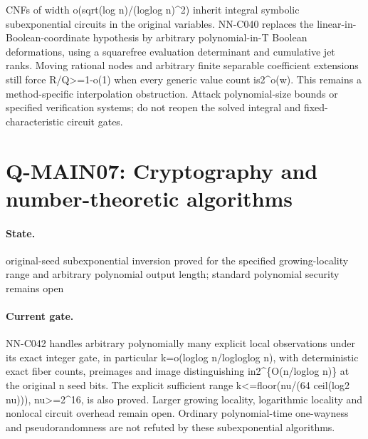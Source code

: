 CNFs of width o(sqrt(log n)/(loglog n)\textasciicircum{}2) inherit integral symbolic subexponential circuits in the original variables. NN-C040 replaces the linear-in-Boolean-coordinate hypothesis by arbitrary polynomial-in-T Boolean deformations, using a squarefree evaluation determinant and cumulative jet ranks. Moving rational nodes and arbitrary finite separable coefficient extensions still force R/Q>=1-o(1) when every generic value count is2\textasciicircum{}o(w). This remains a method-specific interpolation obstruction. Attack polynomial-size bounds or specified verification systems; do not reopen the solved integral and fixed-characteristic circuit gates.

\section{Q-MAIN07: Cryptography and number-theoretic algorithms}
\paragraph{State.} original-seed subexponential inversion proved for the specified growing-locality range and arbitrary polynomial output length; standard polynomial security remains open
\paragraph{Current gate.} NN-C042 handles arbitrary polynomially many explicit local observations under its exact integer gate, in particular k=o(loglog n/logloglog n), with deterministic exact fiber counts, preimages and image distinguishing in2\textasciicircum{}\{O(n/loglog n)\} at the original n seed bits. The explicit sufficient range k<=floor(nu/(64 ceil(log2 nu))), nu>=2\textasciicircum{}16, is also proved. Larger growing locality, logarithmic locality and nonlocal circuit overhead remain open. Ordinary polynomial-time one-wayness and pseudorandomness are not refuted by these subexponential algorithms.
